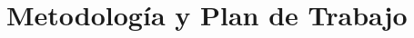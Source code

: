 \documentclass[12pt,spanish]{article}
\begin{document}
%

\vfill
\section*{Metodología y Plan de Trabajo}
\end{document}
